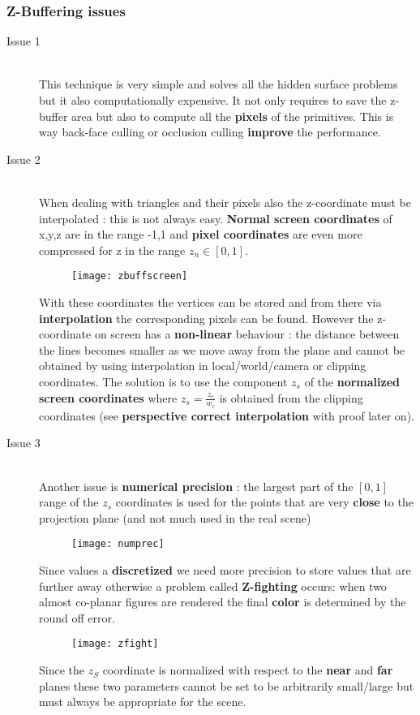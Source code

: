 \subsubsection{Z-Buffering issues}
\begin{description}
\item[Issue 1]\hfill\\
This technique is very simple and solves all the hidden surface problems but it also computationally expensive. It not only requires to save the z-buffer area but also to compute all the \textbf{pixels} of the primitives. This is way back-face culling or occlusion culling \textbf{improve} the performance.
\item[Issue 2]\hfill\\
When dealing with triangles and their pixels also the z-coordinate must be interpolated : this is not always easy. \textbf{Normal screen coordinates} of x,y,z are in the range -1,1 and \textbf{pixel coordinates} are even more compressed for z in the range $z_n \in [0,1]$. 
\begin{figure}[H]
  \centering
  \texttt{[image: zbuffscreen]}
\end{figure}
With these coordinates the vertices can be stored and from there via \textbf{interpolation} the corresponding pixels can be found. However the z-coordinate on screen has a \textbf{non-linear} behaviour : the distance between the lines becomes smaller as we move away from the plane and cannot be obtained by using interpolation in local/world/camera or clipping coordinates. The solution is to use the component $z_s$ of the \textbf{normalized screen coordinates} where $z_s = \frac{z_c}{w_c}$ is obtained from the clipping coordinates (see \textbf{perspective correct interpolation} with proof later on).
\item[Issue 3]\hfill\\
Another issue is \textbf{numerical precision} : the largest part of the $[0,1]$ range of the $z_s$ coordinates is used for the points that are very \textbf{close} to the projection plane (and not much used in the real scene)
\begin{figure}[H]
  \centering
  \texttt{[image: numprec]}
\end{figure}
Since values a \textbf{discretized} we need more precision to store values that are further away otherwise a problem called \textbf{Z-fighting} occurs: when two almost co-planar figures are rendered the final \textbf{color} is determined by the round off error.
\begin{figure}[H]
  \centering
  \texttt{[image: zfight]}
\end{figure}
Since the $z_S$ coordinate is normalized with respect to the \textbf{near} and \textbf{far} planes these two parameters cannot be set to be arbitrarily small/large but must always be appropriate for the scene.
\end{description}

